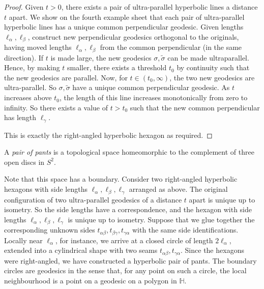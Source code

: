 \begin{proof}
	Given $t > 0$, there exists a pair of ultra-parallel hyperbolic lines a distance $t$ apart.
	We show on the fourth example sheet that each pair of ultra-parallel hyperbolic lines has a unique common perpendicular geodesic.
	Given lengths $\ell_\alpha, \ell_\beta$, construct new perpendicular geodesics orthogonal to the originals, having moved lengths $\ell_\alpha, \ell_\beta$ from the common perpendicular (in the same direction).
	If $t$ is made large, the new geodesics $\sigma, \widetilde \sigma$ can be made ultraparallel.
	Hence, by making $t$ smaller, there exists a threshold $t_0$ by continuity such that the new geodesics are parallel.
	Now, for $t \in (t_0,\infty)$, the two new geodesics are ultra-parallel.
	So $\sigma, \widetilde \sigma$ have a unique common perpendicular geodesic.
	As $t$ increases above $t_0$, the length of this line increases monotonically from zero to infinity.
	So there exists a value of $t > t_0$ such that the new common perpendicular has length $\ell_\gamma$.
	\begin{center}
	\end{center}
	This is exactly the right-angled hyperbolic hexagon as required.
\end{proof}
\begin{definition}
	A \textit{pair of pants} is a topological space homeomorphic to the complement of three open discs in $S^2$.
\end{definition}
Note that this space has a boundary.
Consider two right-angled hyperbolic hexagons with side lengths $\ell_\alpha, \ell_\beta, \ell_\gamma$ arranged as above.
The original configuration of two ultra-parallel geodesics of a distance $t$ apart is unique up to isometry.
So the side lengths have a correspondence, and the hexagon with side lengths $\ell_\alpha, \ell_\beta, \ell_\gamma$ is unique up to isometry.
Suppose that we glue together the corresponding unknown sides $t_{\alpha\beta}, t_{\beta\gamma}, t_{\gamma\alpha}$ with the same side identifications.
Locally near $\ell_\alpha$, for instance, we arrive at a closed circle of length $2\ell_\alpha$, extended into a cylindrical shape with two seams $t_{\alpha\beta}, t_{\gamma\alpha}$.
Since the hexagons were right-angled, we have constructed a hyperbolic pair of pants.
The boundary circles are geodesics in the sense that, for any point on such a circle, the local neighbourhood is a point on a geodesic on a polygon in $\mathbb H$.

